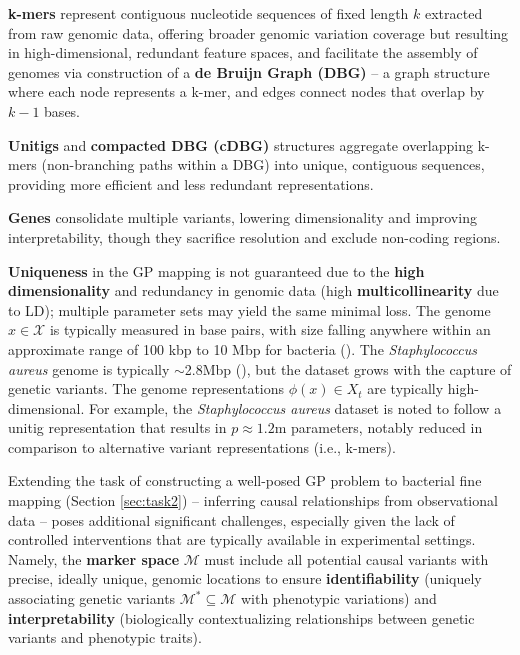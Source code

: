 \documentclass[12pt]{article}
\begin{document}
\textbf{k-mers} represent contiguous nucleotide sequences of fixed length $k$ extracted from raw genomic data, offering broader genomic variation coverage but resulting in high-dimensional, redundant feature spaces, and facilitate the assembly of genomes via construction of a \textbf{de Bruijn Graph (DBG)} -- a graph structure where each node represents a k-mer, and edges connect nodes that overlap by $k-1$ bases. 

\textbf{Unitigs} and \textbf{compacted DBG (cDBG)} structures aggregate overlapping k-mers (non-branching paths within a DBG) into unique, contiguous sequences, providing more efficient and less redundant representations. 

\textbf{Genes} consolidate multiple variants, lowering dimensionality and improving interpretability, though they sacrifice resolution and exclude non-coding regions. 


\textbf{Uniqueness} in the GP mapping is not guaranteed due to the \textbf{high dimensionality} and redundancy in genomic data (high \textbf{multicollinearity} due to LD); multiple parameter sets may yield the same minimal loss. The genome $x \in \mathcal{X}$ is typically measured in base pairs, with size falling anywhere within an approximate range of 100 kbp to 10 Mbp for bacteria (\cite{rodriguez2022genomic}). The \textit{Staphylococcus aureus} genome is typically $\sim$2.8Mbp (\cite{holden2004complete}), but the dataset grows with the capture of genetic variants. The genome representations $\phi(x) \in X_t$ are typically high-dimensional. For example, the \textit{Staphylococcus aureus} dataset is noted to follow a unitig representation that results in $p\approx 1.2$m parameters, notably reduced in comparison to alternative variant representations (i.e., k-mers). 

Extending the task of constructing a well-posed GP problem to bacterial fine mapping (Section \ref{sec:task2}) -- inferring causal relationships from observational data -- poses additional significant challenges, especially given the lack of controlled interventions that are typically available in experimental settings. Namely, the \textbf{marker space} $\mathcal{M}$ must include all potential causal variants with precise, ideally unique, genomic locations to ensure \textbf{identifiability} (uniquely associating genetic variants $\mathcal{M}^* \subseteq \mathcal{M}$ with phenotypic variations) and \textbf{interpretability} (biologically contextualizing relationships between genetic variants and phenotypic traits). 
\end{document}
